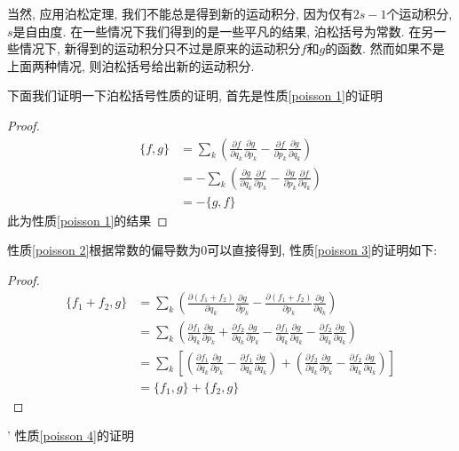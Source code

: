 \documentclass[a4paper,11pt]{book}
\newtheorem{proof}{证明}[section]
\begin{document}
当然, 应用泊松定理, 我们不能总是得到新的运动积分, 因为仅有$2s-1$个运动积分, $s$是自由度. 在一些情况下我们得到的是一些平凡的结果, 泊松括号为常数. 在另一些情况下, 新得到的运动积分只不过是原来的运动积分$f$和$g$的函数. 然而如果不是上面两种情况, 则泊松括号给出新的运动积分.

\indent 下面我们证明一下泊松括号性质的证明, 首先是性质\ref{poisson 1}的证明
\begin{proof}
\begin{equation*}
  \begin{split}
     \{f,g\}&=\sum_{k}\left(\frac{\partial f}{\partial{q_k}}\frac{\partial g}{\partial{p_k}}-\frac{\partial f}{\partial{p_k}}\frac{\partial g}{\partial{q_k}}\right) \\
       &=-\sum_{k}\left(\frac{\partial g}{\partial{q_k}}\frac{\partial f}{\partial{p_k}}-\frac{\partial g}{\partial{p_k}}\frac{\partial f}{\partial{q_k}}\right) \\
       &=-\{g,f\}
  \end{split}
\end{equation*}
此为性质\ref{poisson 1}的结果
\end{proof}
性质\ref{poisson 2}根据常数的偏导数为$0$可以直接得到, 性质\ref{poisson 3}的证明如下:
\begin{proof}
  \begin{equation*}
    \begin{split}
       \{f_1+f_2,g\}&=\sum_{k}\left(\frac{\partial{(f_1+f_2)}}{\partial{q_k}}\frac{\partial g}{\partial{p_k}}-\frac{\partial{(f_1+f_2)}}{\partial{p_k}}\frac{\partial g}{\partial{q_k}}\right) \\
         &=\sum_{k}\left(\frac{\partial f_1}{\partial{q_k}}\frac{\partial g}{\partial{p_k}}+\frac{\partial f_2}{\partial{q_k}}\frac{\partial g}{\partial{p_k}}-\frac{\partial f_1}{\partial{q_k}}\frac{\partial g}{\partial{q_k}}-\frac{\partial f_2}{\partial{q_k}}\frac{\partial g}{\partial{q_k}}\right) \\
         &=\sum_{k}\left[\left(\frac{\partial f_1}{\partial{q_k}}\frac{\partial g}{\partial{p_k}}-\frac{\partial f_1}{\partial{q_k}}\frac{\partial g}{\partial{q_k}}\right)+\left(\frac{\partial f_2}{\partial{q_k}}\frac{\partial g}{\partial{p_k}}-\frac{\partial f_2}{\partial{q_k}}\frac{\partial g}{\partial{q_k}}\right)\right] \\
         &=\{f_1,g\}+\{f_2,g\}
    \end{split}
  \end{equation*}
\end{proof}'
性质\ref{poisson 4}的证明
\end{document}
